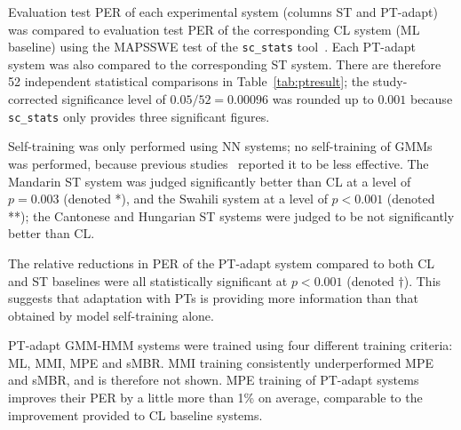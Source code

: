 {\color{blue} Evaluation test PER of each experimental system (columns
{\sc ST} and {\sc PT-adapt}) was compared to evaluation test PER of
the corresponding {\sc CL} system (ML baseline) 
using the MAPSSWE test of the {\tt sc\_stats} tool~\cite{Pallet90}.
{\color{blue} Each {\sc PT-adapt} system was also compared to the
corresponding {\sc ST} system.}  There are {\sc therefore}
{\color{blue} 52} independent statistical comparisons in
Table~\ref{tab:ptresult}; the study-corrected significance level of
{\color{blue} $0.05/52=0.00096$ was rounded up to $0.001$} because {\tt
sc\_stats} only provides three significant figures.

Self-training was only performed
using NN systems; no self-training of GMMs was performed, because
previous studies~\cite{Huang2013} reported it to be less effective.
The Mandarin {\sc ST} system was judged significantly better
than {\sc CL} at a level of $p=0.003$ (denoted *), and the Swahili
system at a level of $p<0.001$ (denoted **); the Cantonese and
Hungarian {\sc ST} systems were judged to be not significantly better
than {\sc CL}.

The relative reductions in PER
of the {\sc PT-adapt} system
compared to both {\sc CL} and {\sc ST} baselines
were all statistically
significant at $p<0.001$ (denoted $\dagger$).  This suggests that adaptation
with PTs is providing more information than that obtained by model
self-training alone.

{\color{blue} PT-adapt GMM-HMM systems were trained using four
different training criteria: ML, MMI, MPE and sMBR.  MMI training
consistently underperformed MPE and sMBR, and is therefore not shown.
MPE training of {\sc PT-adapt} systems improves their PER by a little
more than 1\% on average, comparable to the improvement provided
to {\sc CL} baseline systems.}

}

